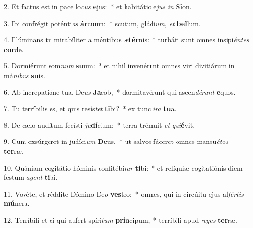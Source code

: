 2. Et factus est in pace lo\textit{cus} \textbf{e}jus:~*  et habitátio e\textit{jus} \textit{in} \textbf{Si}on.\

3. Ibi confrégit poténti\textit{as} \textbf{ár}cuum:~*  scutum, gládi\textit{um}, \textit{et} \textbf{bel}lum.\

4. Illúminans tu mirabíliter a móntibus \textit{æ}\textbf{tér}nis:~*  turbáti sunt omnes insipi\textit{én}\textit{tes} \textbf{cor}de.\

5. Dormiérunt som\textit{num} \textbf{su}um:~*  et nihil invenérunt omnes viri divitiárum in má\textit{ni}\textit{bus} \textbf{su}is.\

6. Ab increpatióne tua, De\textit{us} \textbf{Ja}cob,~*  dormitavérunt qui ascen\textit{dé}\textit{runt} \textbf{e}quos.\

7. Tu terríbilis es, et quis resís\textit{tet} \textbf{ti}bi?~*  ex tunc \textit{i}\textit{ra} \textbf{tu}a.\

8. De cælo audítum fecísti \textit{ju}\textbf{dí}cium:~*  terra trémuit \textit{et} \textit{qui}\textbf{é}vit.\

9. Cum exsúrgeret in judíci\textit{um} \textbf{De}us,~*  ut salvos fáceret omnes mansu\textit{é}\textit{tos} \textbf{ter}ræ.\

10. Quóniam cogitátio hóminis confitébi\textit{tur} \textbf{ti}bi:~*  et relíquiæ cogitatiónis diem festum \textit{a}\textit{gent} \textbf{ti}bi.\

11. Vovéte, et réddite Dómino De\textit{o} \textbf{ves}tro:~*  omnes, qui in circúitu ejus af\textit{fér}\textit{tis} \textbf{mú}nera.\

12. Terríbili et ei qui aufert spíri\textit{tum} \textbf{prín}cipum,~*  terríbili apud \textit{re}\textit{ges} \textbf{ter}ræ.\

